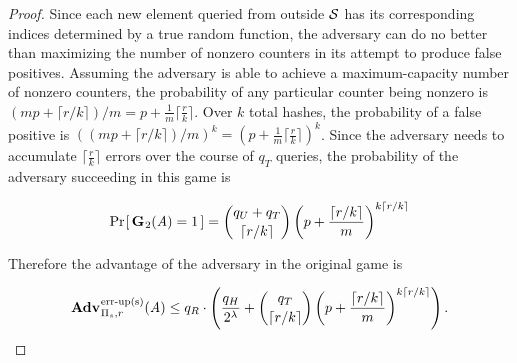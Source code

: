 \begin{proof}
Since each new element queried from outside $\mathcal{S}$ has its corresponding indices determined by a true random function, the adversary can do no better than maximizing the number of nonzero counters in its attempt to produce false positives. Assuming the adversary is able to achieve a maximum-capacity number of nonzero counters, the probability of any particular counter being nonzero is $(mp + \lceil r/k \rceil)/m = p + \frac{1}{m}\lceil\frac{r}{k}\rceil$. Over $k$ total hashes, the probability of a false positive is $\left((mp + \lceil r/k \rceil)/m\right)^k = \left(p + \frac{1}{m}\lceil\frac{r}{k}\rceil\right)^k$. Since the adversary needs to accumulate $\lceil\frac{r}{k}\rceil$ errors over the course of $q_T$ queries, the probability of the adversary succeeding in this game is

$$\Pr\hspace{-1pt}\left[\,\mathbf{G}\hspace{0.5pt}_2(\mathit{A}) = 1\,\right] = \binom{q_U + q_T}{\lceil r/k \rceil}\left(p+\frac{\lceil r/k \rceil}{m}\right)^{k\lceil r/k \rceil}$$

Therefore the advantage of the adversary in the original game is

$$\Adv{\erreps}_{\struct_s,r}(\advA) \le q_R \cdot \left(\frac{q_H}{2^\lambda} + \binom{q_T}{\lceil r/k \rceil}\left(p+\frac{\lceil r/k \rceil}{m}\right)^{k\lceil r/k \rceil}\right).$$\missingqed




\end{proof}

